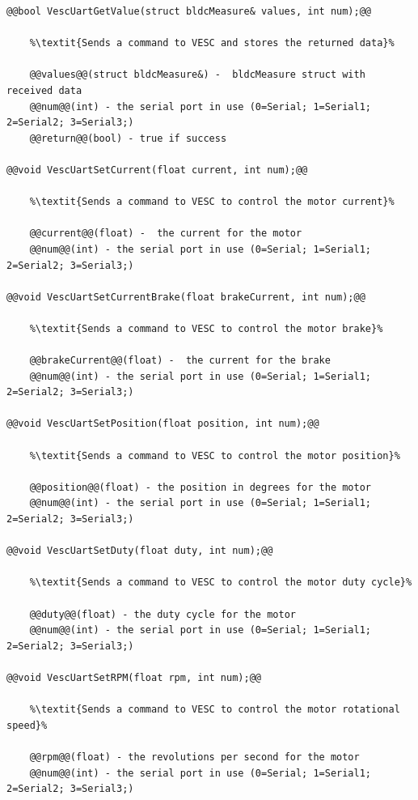 \begin{lstlisting}[style=codedef]
@@bool VescUartGetValue(struct bldcMeasure& values, int num);@@
	
	%\textit{Sends a command to VESC and stores the returned data}%

	@@values@@(struct bldcMeasure&) -  bldcMeasure struct with received data
	@@num@@(int) - the serial port in use (0=Serial; 1=Serial1; 2=Serial2; 3=Serial3;)
	@@return@@(bool) - true if success

@@void VescUartSetCurrent(float current, int num);@@
	
	%\textit{Sends a command to VESC to control the motor current}%

	@@current@@(float) -  the current for the motor
	@@num@@(int) - the serial port in use (0=Serial; 1=Serial1; 2=Serial2; 3=Serial3;)

@@void VescUartSetCurrentBrake(float brakeCurrent, int num);@@
	
	%\textit{Sends a command to VESC to control the motor brake}%

	@@brakeCurrent@@(float) -  the current for the brake
	@@num@@(int) - the serial port in use (0=Serial; 1=Serial1; 2=Serial2; 3=Serial3;)

@@void VescUartSetPosition(float position, int num);@@
	
	%\textit{Sends a command to VESC to control the motor position}%

	@@position@@(float) - the position in degrees for the motor
	@@num@@(int) - the serial port in use (0=Serial; 1=Serial1; 2=Serial2; 3=Serial3;)

@@void VescUartSetDuty(float duty, int num);@@
	
	%\textit{Sends a command to VESC to control the motor duty cycle}%

	@@duty@@(float) - the duty cycle for the motor
	@@num@@(int) - the serial port in use (0=Serial; 1=Serial1; 2=Serial2; 3=Serial3;)

@@void VescUartSetRPM(float rpm, int num);@@
	
	%\textit{Sends a command to VESC to control the motor rotational speed}%

	@@rpm@@(float) - the revolutions per second for the motor
	@@num@@(int) - the serial port in use (0=Serial; 1=Serial1; 2=Serial2; 3=Serial3;)

\end{lstlisting}


